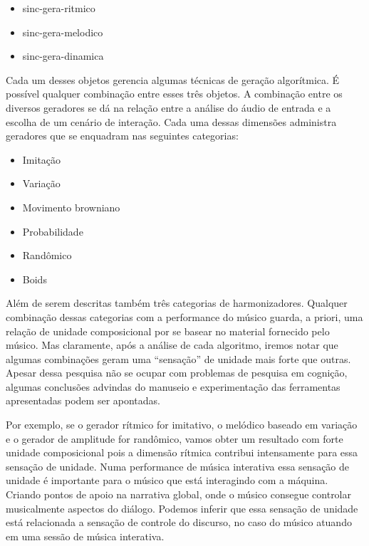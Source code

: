\documentclass{ppgmus}
\begin{document}
\begin{itemize}
 \item   sinc-gera-ritmico
 \item   sinc-gera-melodico
 \item   sinc-gera-dinamica
\end{itemize}

Cada um desses objetos gerencia algumas técnicas de geração
algorítmica. É possível qualquer combinação entre esses três objetos.
A combinação entre os diversos geradores se dá na relação entre a 
análise do áudio de entrada e a escolha de um cenário de interação. 
Cada uma dessas dimensões administra geradores que se enquadram nas seguintes
categorias:

\begin{itemize}
 \item   Imitação
 \item   Variação
 \item   Movimento browniano
 \item   Probabilidade
 \item   Randômico
 \item   Boids
\end{itemize}

Além de serem descritas também três categorias de harmonizadores.
Qualquer combinação dessas categorias com a performance do músico guarda, a priori,  
uma relação de unidade composicional por se basear no material fornecido pelo músico.
Mas claramente, após a análise de cada algoritmo, iremos notar que algumas combinações 
geram uma ``sensação'' de unidade mais forte que outras. Apesar dessa pesquisa
não se ocupar com problemas de pesquisa em cognição, algumas conclusões advindas
do manuseio e experimentação das ferramentas apresentadas podem ser apontadas.

Por exemplo, se o gerador rítmico for imitativo, o melódico baseado em
variação e o gerador de amplitude for randômico, vamos obter um resultado
com forte unidade composicional pois a dimensão rítmica contribui intensamente
para essa sensação de unidade. Numa performance de música interativa essa sensação
de unidade é importante para o músico que está interagindo com a máquina. Criando
pontos de apoio na narrativa global, onde o músico consegue controlar musicalmente 
aspectos do diálogo. Podemos inferir que essa sensação de unidade está relacionada
a sensação de controle do discurso, no caso do músico atuando em uma sessão de música
interativa.

% 
% 
\end{document}
